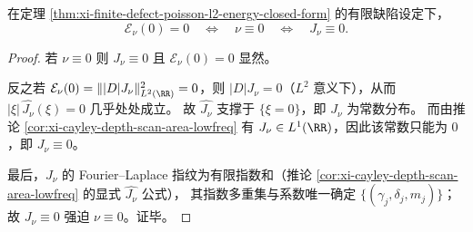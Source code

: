 \begin{proposition}\label{prop:xi-finite-defect-poisson-l2-energy-zero-rigidity}
在定理 \ref{thm:xi-finite-defect-poisson-l2-energy-closed-form} 的有限缺陷设定下，
\[
\mathcal E_\nu(0)=0
\quad\Longleftrightarrow\quad
\nu\equiv 0
\quad\Longleftrightarrow\quad
J_\nu\equiv 0.
\]
\end{proposition}
\begin{proof}
若 \(\nu\equiv 0\) 则 \(J_\nu\equiv 0\) 且 \(\mathcal E_\nu(0)=0\) 显然。
\par
反之若 \(\mathcal E_\nu(0)=\||D|J_\nu\|_{L^2(\RR)}^2=0\)，则 \(|D|J_\nu=0\)（\(L^2\) 意义下），从而
\(|\xi|\,\widehat{J_\nu}(\xi)=0\) 几乎处处成立。
故 \(\widehat{J_\nu}\) 支撑于 \(\{\xi=0\}\)，即 \(J_\nu\) 为常数分布。
而由推论 \ref{cor:xi-cayley-depth-scan-area-lowfreq} 有 \(J_\nu\in L^1(\RR)\)，因此该常数只能为 \(0\)，即 \(J_\nu\equiv 0\)。
\par
最后，\(J_\nu\) 的 Fourier--Laplace 指纹为有限指数和（推论 \ref{cor:xi-cayley-depth-scan-area-lowfreq} 的显式 \(\widehat{J_\nu}\) 公式），
其指数多重集与系数唯一确定 \(\{(\gamma_j,\delta_j,m_j)\}\)；
故 \(J_\nu\equiv 0\) 强迫 \(\nu\equiv 0\)。证毕。
\end{proof}

\endinput
